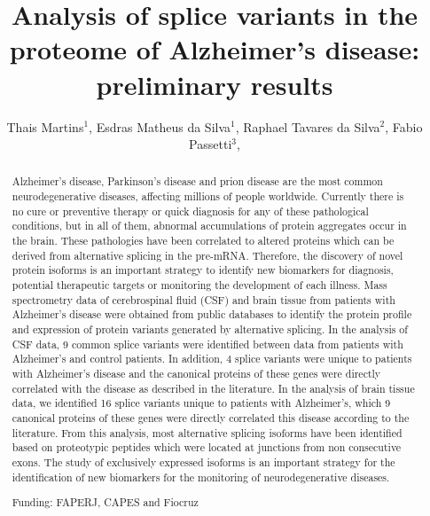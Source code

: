 \documentclass[twoside]{article}
\title{\vspace{-15mm}\fontsize{24pt}{10pt}\selectfont\textbf{ Analysis of splice variants in the proteome of Alzheimer's disease: preliminary results }} %
\author{ Thais Martins$^{1}$, Esdras Matheus da Silva$^{1}$, Raphael Tavares da Silva$^{2}$, Fabio Passetti$^{3}$, }
\affil{ 1 Oswaldo Cruz Institute

2 Universidade Federal de Minas Gerais

3 FIOCRUZ - IOC

 }
\date{}
\begin{document}
  
  
  \maketitle %
  
  
  \thispagestyle{fancy} %
  
  
  \begin{abstract}
  Alzheimer’s disease, Parkinson’s disease and prion disease are the most common neurodegenerative diseases, affecting millions of people worldwide. Currently there is no cure or preventive therapy or quick diagnosis for any of these pathological conditions, but in all of them, abnormal accumulations of protein aggregates occur in the brain. These pathologies have been correlated to altered proteins which can be derived from alternative splicing in the pre-mRNA. Therefore, the discovery of novel protein isoforms is an important strategy to identify new biomarkers for diagnosis, potential therapeutic targets or monitoring the development of each illness. Mass spectrometry data of cerebrospinal fluid (CSF) and brain tissue from patients with Alzheimer's disease were obtained from public databases to identify the protein profile and expression of protein variants generated by alternative splicing. In the analysis of CSF data, 9 common splice variants were identified between data from patients with Alzheimer's and control patients. In addition, 4 splice variants were unique to patients with Alzheimer's disease and the canonical proteins of these genes were directly correlated with the disease as described in the literature. In the analysis of brain tissue data, we identified 16 splice variants unique to patients with Alzheimer's, which 9 canonical proteins of these genes were directly correlated this disease according to the literature. From this analysis, most alternative splicing isoforms have been identified based on proteotypic peptides which were located at junctions from non consecutive exons. The study of exclusively expressed isoforms is an important strategy for the identification of new biomarkers for the monitoring of neurodegenerative diseases.
  
  Funding: FAPERJ, CAPES and Fiocruz \\ 
  \end{abstract}
  
\end{document}
